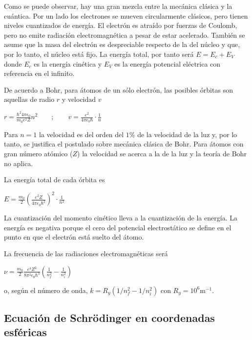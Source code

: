 \documentclass[oneside]{book}
\numberwithin{equation}{section}
\numberwithin{figure}{section}
\numberwithin{table}{section}
\begin{document}
				Como se puede observar, hay una gran mezcla entre la mecánica clásica y la cuántica. Por un lado los electrones se mueven circularmente clásicos, pero tienen niveles cuantizados de energía. El electrón es atraído por fuerzas de Coulomb, pero no emite radiación electromagnética a pesar de estar acelerado. También se asume que la masa del electrón es despreciable respecto de la del núcleo y que, por lo tanto, el núcleo está fijo. La energía total, por tanto será $E=E_c+E_V$ donde $E_c$ es la energía cinética y $E_V$ es la energía potencial eléctrica con referencia en el infinito.

				De acuerdo a Bohr, para átomos de un sólo electrón, las posibles órbitas son aquellas de radio $r$ y velocidad $v$ 

				\begin{center}
					$r=\frac{\hbar^{2}4\pi \epsilon_{0}}{m_{0}e^{2}Z} n^{2} \qquad ; \qquad v=\frac{e^{2}}{4 \pi \epsilon_{0} \hbar} \cdot \frac{1}{n}$
				\end{center}

				Para $n=1$ la velocidad es del orden del $1\%$ de la velocidad de la luz y, por lo tanto, se justifica el postulado sobre mecánica clásica de Bohr. Para átomos con gran número atómico ($Z$) la velocidad se acerca a la de la luz y la teoría de Bohr no aplica.

La energía total de cada órbita es 

				\begin{center}
					$E=\frac{m_0}{2} \left( \frac{e^2 Z}{4 \pi \epsilon_0 \hbar^2} \right)^2 \cdot \frac{1}{n^{2}}$
				\end{center}

				La cuantización del momento cinético lleva a la cuantización de la energía. La energía es negativa porque el cero del potencial electrostático se define en el punto en que el electrón está suelto del átomo.

				La frecuencia de las radiaciones electromagnéticas será 

				\begin{center}
					$\nu=\frac{m_0}{2} \frac{e^4 Z^2}{8 \pi^2 \epsilon_0 \hbar^3} \left( \frac{1}{n_f^2}-\frac{1}{n_i^2} \right)$
				\end{center}

				o, según el número de onda, $k=R_{y}(1/n_{f}^{2}-1/n_{i}^{2})$ con $R_{y}=10^{6}\textrm{m}^{-1}$.		
		
			\subsection{Ecuación de Schrödinger en coordenadas esféricas}
\end{document}
